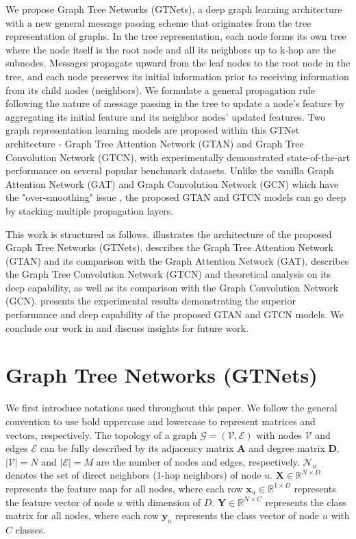 \documentclass[lettersize,journal]{IEEEtran}
\theoremstyle{plain}
\theoremstyle{definition}
\theoremstyle{remark}
\begin{document}
We propose Graph Tree Networks (GTNets), a deep graph learning architecture with a new general message passing scheme that originates from the tree representation of graphs. In the tree representation, each node forms its own tree where the node itself is the root node and all its neighbors up to k-hop are the subnodes. Messages propagate upward from the leaf nodes to the root node in the tree, and each node preserves its initial information prior to receiving information from its child nodes (neighbors). We formulate a general propagation rule following the nature of message passing in the tree to update a node's feature by aggregating its initial feature and its neighbor nodes' updated features. Two graph representation learning models are proposed within this GTNet architecture - Graph Tree Attention Network (GTAN) and Graph Tree Convolution Network (GTCN), with experimentally demonstrated state-of-the-art performance on several popular benchmark datasets. Unlike the vanilla Graph Attention Network (GAT) and Graph Convolution Network (GCN) which have the "over-smoothing" issue \cite{xu2018representation, li2018deeper, chen2020measuring}, the proposed GTAN and GTCN models can go deep by stacking multiple propagation layers.

This work is structured as follows.  illustrates the architecture of the proposed Graph Tree Networks (GTNets).  describes the Graph Tree Attention Network (GTAN) and its comparison with the Graph Attention Network (GAT).  describes the Graph Tree Convolution Network (GTCN) and theoretical analysis on its deep capability, as well as its comparison with the Graph Convolution Network (GCN).  presents the experimental results demonstrating the superior performance and deep capability of the proposed GTAN and GTCN models. We conclude our work in  and discuss insights for future work.

\section{Graph Tree Networks (GTNets)}
\label{model}

We first introduce notations used throughout this paper. We follow the general convention to use bold uppercase and lowercase to represent matrices and vectors, respectively. The topology of a graph $\mathcal{G}=(\mathcal{V},\mathcal{E})$ with nodes $\mathcal{V}$ and edges $\mathcal{E}$ can be fully described by its adjacency matrix $\bm{A}$ and degree matrix $\bm{D}$. $|\mathcal{V}| = N$ and $|\mathcal{E}| = M$ are the number of nodes and edges, respectively. $\mathcal{N}_u$ denotes the set of direct neighbors (1-hop neighbors) of node $u$. $\bm{X} \in \mathbb{R}^{N \times D}$ represents the feature map for all nodes, where each row $\bm{x}_u \in \mathbb{R}^{1 \times D}$ represents the feature vector of node $u$ with dimension of $D$. $\bm{Y} \in \mathbb{R}^{N \times C}$ represents the class matrix for all nodes, where each row $\bm{y}_u$ represents the class vector of node $u$ with $C$ classes. 
\end{document}
